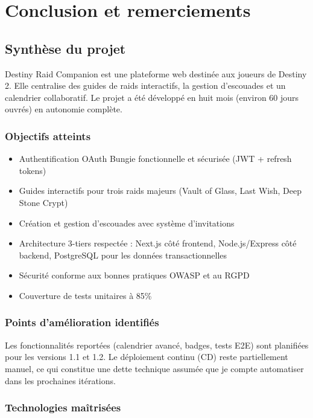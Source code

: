 \chapter{Conclusion et remerciements}

\section{Synthèse du projet}

Destiny Raid Companion est une plateforme web destinée aux joueurs de Destiny 2. Elle centralise des guides de raids interactifs, la gestion d'escouades et un calendrier collaboratif. Le projet a été développé en huit mois (environ 60 jours ouvrés) en autonomie complète.

\subsection*{Objectifs atteints}

\begin{itemize}
    \item Authentification OAuth Bungie fonctionnelle et sécurisée (JWT + refresh tokens)
    \item Guides interactifs pour trois raids majeurs (Vault of Glass, Last Wish, Deep Stone Crypt)
    \item Création et gestion d'escouades avec système d'invitations
    \item Architecture 3-tiers respectée : Next.js côté frontend, Node.js/Express côté backend, PostgreSQL pour les données transactionnelles
    \item Sécurité conforme aux bonnes pratiques OWASP et au RGPD
    \item Couverture de tests unitaires à 85\%
\end{itemize}

\subsection*{Points d'amélioration identifiés}

Les fonctionnalités reportées (calendrier avancé, badges, tests E2E) sont planifiées pour les versions 1.1 et 1.2. Le déploiement continu (CD) reste partiellement manuel, ce qui constitue une dette technique assumée que je compte automatiser dans les prochaines itérations.

\subsection*{Technologies maîtrisées}

